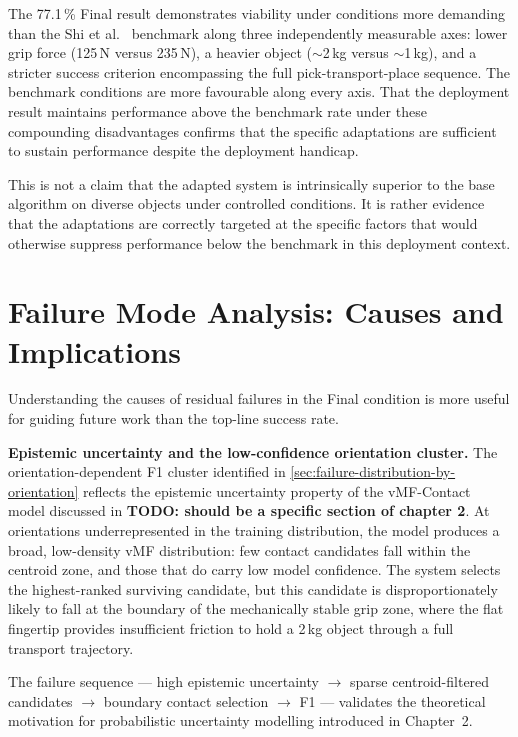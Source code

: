 \documentclass[12pt, a4paper]{report}
\begin{document}
The 77.1\,\% Final result demonstrates viability under conditions more demanding than the Shi et al.~\cite{shi2025} benchmark along three independently measurable axes: lower grip force (125\,N versus 235\,N), a heavier object ($\sim$2\,kg versus $\sim$1\,kg), and a stricter success criterion encompassing the full pick-transport-place sequence. The benchmark conditions are more favourable along every axis. That the deployment result maintains performance above the benchmark rate under these compounding disadvantages confirms that the specific adaptations are sufficient to sustain performance despite the deployment handicap. 

This is not a claim that the adapted system is intrinsically superior to the base algorithm on diverse objects under controlled conditions. It is rather evidence that the adaptations are correctly targeted at the specific factors that would otherwise suppress performance below the benchmark in this deployment context.

\section{Failure Mode Analysis: Causes and Implications}
\label{sec:failure-mode-analysis-discussion}

Understanding the causes of residual failures in the Final condition is more useful for guiding future work than the top-line success rate.

\textbf{Epistemic uncertainty and the low-confidence orientation cluster.} 
The orientation-dependent F1 cluster identified in \cref{sec:failure-distribution-by-orientation} reflects the epistemic uncertainty property of the vMF-Contact model discussed in \textbf{TODO: should be a specific section of chapter 2}. At orientations underrepresented in the training distribution, the model produces a broad, low-density vMF distribution: few contact candidates fall within the centroid zone, and those that do carry low model confidence. 
The system selects the highest-ranked surviving candidate, but this candidate is disproportionately likely to fall at the boundary of the mechanically stable grip zone, where the flat fingertip provides insufficient friction to hold a 2\,kg object through a full transport trajectory.

The failure sequence --- high epistemic uncertainty $\rightarrow$ sparse centroid-filtered candidates $\rightarrow$ boundary contact selection $\rightarrow$ F1 --- validates the theoretical motivation for probabilistic uncertainty modelling introduced in Chapter~2. 
\end{document}
